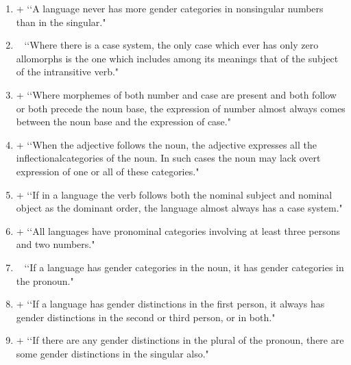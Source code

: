 \begin{enumerate}
\item +  \lq\lq A language never has more gender categories in nonsingular numbers than in the singular." 

\item ~  \lq\lq Where there is a case system, the only case which ever has only zero allomorphs is the one which includes among its meanings that of the subject of the intransitive verb." 

\item +  \lq\lq Where morphemes of both number and case are present and both follow or both precede the noun base, the expression of number almost always comes between the noun base and the expression of case." 

\item +  \lq\lq When the adjective follows the noun, the adjective expresses all the inflectionalcategories of the noun. In such cases the noun may lack overt expression of one or all of these categories." 

\item +  \lq\lq If in a language the verb follows both the nominal subject and nominal object as the dominant order, the language almost always has a case system." 

\item +  \lq\lq All languages have pronominal categories involving at least three persons and two numbers." 

\item ~  \lq\lq If a language has gender categories in the noun, it has gender categories in the pronoun." 

\item + \lq\lq If a language has gender distinctions in the first person, it always has gender distinctions in the second or third person, or in both." 

\item + \lq\lq If there are any gender distinctions in the plural of the pronoun, there are some gender distinctions in the singular also."


\end{enumerate}
\endgroup


\vfill
